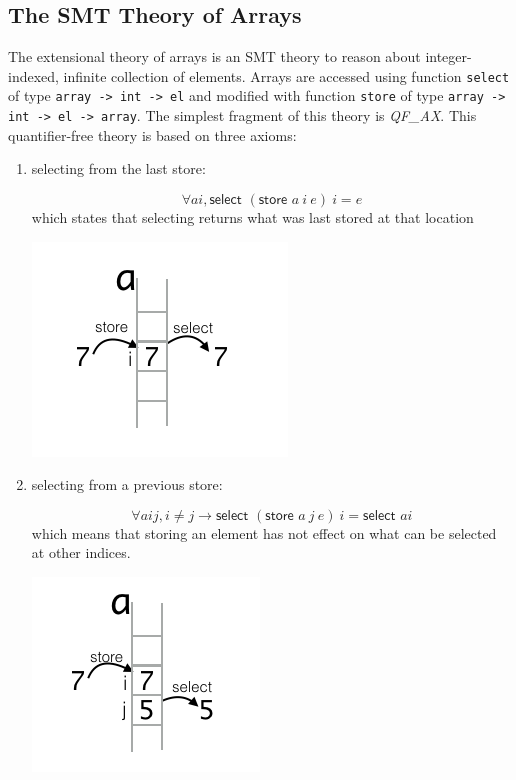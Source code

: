 \documentclass[onecolumn, preprint]{sigplanconf}
\begin{document}
\subsection{The SMT Theory of Arrays}
The extensional theory of arrays is an SMT theory to reason about integer-indexed, infinite collection of elements. Arrays are accessed using function \lstinline|select| of type \lstinline|array -> int -> el| and modified with function \lstinline|store| of type \lstinline|array -> int -> el -> array|. The simplest fragment of this theory is \emph{QF\_AX}. This quantifier-free theory is based on three axioms:
\begin{enumerate}
\item selecting from the last store:
  \begin{multicols}{2}
    
  $$ \forall a i, \textsf{select } (\textsf{store } a\ i\ e)\ i = e$$
which states that selecting returns what was last stored at that location
 
\includegraphics[scale=0.5]{pictures/axiom1.png}

  \end{multicols}
  
\item selecting from a previous store:
  \begin{multicols}{2}
  $$ \forall a i j, i \neq j \to \textsf{select } (\textsf{store } a\ j\ e)\ i = \textsf{select } a i$$
  which means that storing an element has not effect on what can be selected at other indices.

  \includegraphics[scale=0.5]{pictures/axiom2.png}
  \end{multicols}
  

\end{enumerate}
\end{document}
